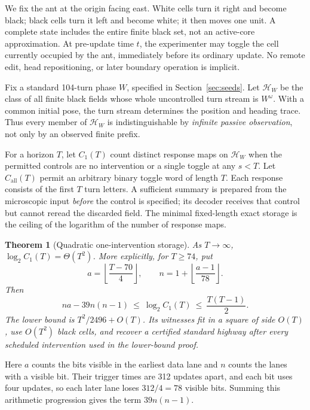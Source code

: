 \documentclass[11pt]{article}
\newtheorem{theorem}{Theorem}
\theoremstyle{definition}\newtheorem{definition}[theorem]{Definition}
\newcommand{\HH}{\mathcal H_W}
\begin{document}
We fix the ant at the origin facing east. White cells turn it right and become
black; black cells turn it left and become white; it then moves one unit.
A complete state includes the entire finite black set, not an active-core
approximation. At pre-update time $t$, the experimenter may toggle the cell
currently occupied by the ant, immediately before its ordinary update. No
remote edit, head repositioning, or later boundary operation is implicit.

Fix a standard 104-turn phase $W$, specified in Section~\ref{sec:seeds}. Let
$\HH$ be the class of all finite black fields whose whole uncontrolled turn
stream is $W^\omega$. With a common initial pose, the turn stream determines
the position and heading trace. Thus every member of $\HH$ is indistinguishable
by \emph{infinite passive observation}, not only by an observed finite prefix.

For a horizon $T$, let $C_1(T)$ count distinct response maps on $\HH$ when the
permitted controls are no intervention or a single toggle at any $s<T$.
Let $C_{\mathrm{all}}(T)$ permit an arbitrary binary toggle word of length $T$.
Each response consists of the first $T$ turn letters. A sufficient summary is
prepared from the microscopic input \emph{before} the control is specified;
its decoder receives that control but cannot reread the discarded field.
The minimal fixed-length exact storage is the ceiling of the logarithm of the
number of response maps.

\begin{theorem}[Quadratic one-intervention storage]\label{th:main}
As $T\to\infty$, $\log_2 C_1(T)=\Theta(T^2)$. More explicitly, for $T\ge74$, put
\[
a=\left\lfloor\frac{T-70}{4}\right\rfloor,
\qquad n=1+\left\lfloor\frac{a-1}{78}\right\rfloor.
\]
Then
\begin{equation}\label{eq:main}
na-39n(n-1)\ \le\ \log_2 C_1(T)\ \le\ \frac{T(T-1)}2.
\end{equation}
The lower bound is $T^2/2496+O(T)$. Its witnesses fit in a square of side $O(T)$,
use $O(T^2)$ black cells, and recover a certified standard highway after every
scheduled intervention used in the lower-bound proof.
\end{theorem}

Here $a$ counts the bits visible in the earliest data lane and $n$ counts
the lanes with a visible bit. Their trigger times are 312 updates apart,
and each bit uses four updates, so each later lane loses $312/4=78$ visible
bits. Summing this arithmetic progression gives the term $39n(n-1)$.
\end{document}
